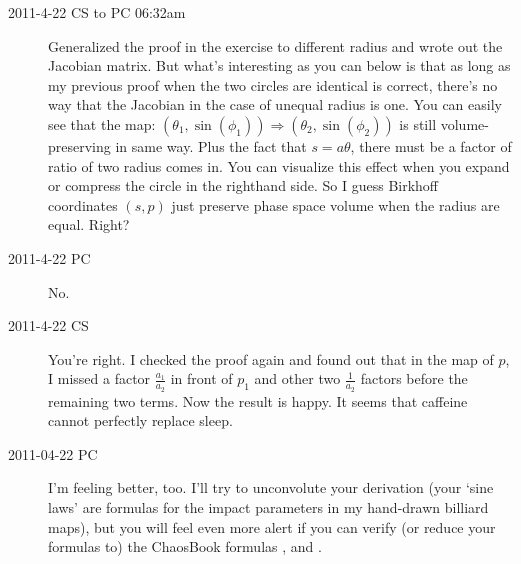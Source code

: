 \begin{description}
\item[2011-4-22 CS to PC 06:32am]  Generalized the proof in the exercise
to different radius and wrote out the Jacobian matrix. But what's
interesting as you can below is that as long as my previous proof when
the two circles are identical is correct, there's no way that the
Jacobian in the case of unequal radius is one. You can easily see that
the map: $(\theta_1, \sin(\phi_1))\Rightarrow(\theta_2, \sin(\phi_2))$ is
still volume-preserving in same way. Plus the fact that $s=a\theta$,
there must be a factor of ratio of two radius comes in. You can visualize
this effect when you expand or compress the circle in the righthand side.
So I guess Birkhoff coordinates $(s,p)$ just preserve phase space volume
when the radius are equal. Right?

\item[2011-4-22 PC] No.

\item[2011-4-22 CS]
You're right. I checked the proof again and found out that in the map of
$p$, I missed a factor $\frac{a_1}{a_2}$ in front of $p_1$ and other two
$\frac{1}{a_2}$ factors before the remaining two terms. Now the result is
happy. It seems that caffeine cannot perfectly replace sleep.

\item[2011-04-22 PC]
I'm feeling better, too. I'll try to unconvolute your derivation (your
`sine laws' are formulas for the impact parameters in my hand-drawn
billiard maps), but you will feel even more alert if you can
verify (or reduce your formulas to) the ChaosBook formulas
,  and .


\end{description}


